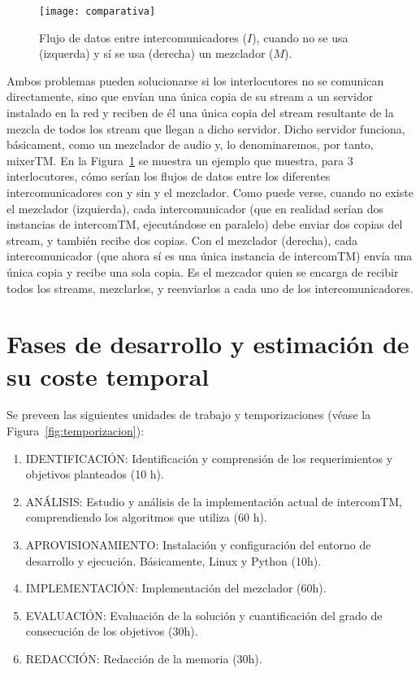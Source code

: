 \documentclass[titlepage, 12pt, a4paper, oneside]{article}
\begin{document}
\begin{figure}
  \begin{center}
    \texttt{[image: comparativa]}
  \end{center}
  \caption{Flujo de datos entre intercomunicadores ($I$), cuando no se
    usa (izquerda) y sí se usa (derecha) un mezclador ($M$).}
  \label{fig:comparativa}
\end{figure}

Ambos problemas pueden solucionarse si los interlocutores no se
comunican directamente, sino que envían una única copia de su stream a
un servidor instalado en la red y reciben de él una única copia del
stream resultante de la mezcla de todos los stream que llegan a dicho
servidor. Dicho servidor funciona, básicament, como un mezclador de
audio y, lo denominaremos, por tanto, mixerTM. En la
Figura~\ref{fig:comparativa} se muestra un ejemplo que muestra, para 3
interlocutores, cómo serían los flujos de datos entre los diferentes
intercomunicadores con y sin y el mezclador. Como puede verse, cuando
no existe el mezclador (izquierda), cada intercomunicador (que en
realidad serían dos instancias de intercomTM, ejecutándose en
paralelo) debe enviar dos copias del stream, y también recibe dos
copias. Con el mezclador (derecha), cada intercomunicador (que ahora
sí es una única instancia de intercomTM) envía una única copia y
recibe una sola copia. Es el mezcador quien se encarga de recibir
todos los streams, mezclarlos, y reenviarlos a cada uno de los
intercomunicadores.

\section{Fases de desarrollo y estimación de su coste temporal}
\label{sec:fases}
Se preveen las siguientes unidades de trabajo y temporizaciones (véase
la Figura~\ref{fig:temporizacion}):
\begin{enumerate}
  \item {IDENTIFICACIÓN}: Identificación y comprensión de los
    requerimientos y objetivos planteados (10 h).
  \item {ANÁLISIS:} Estudio y análisis de la implementación actual de
    intercomTM, comprendiendo los algoritmos que utiliza (60 h).
  \item {APROVISIONAMIENTO}: Instalación y configuración del entorno
    de desarrollo y ejecución. Básicamente, Linux y Python (10h).
  \item {IMPLEMENTACIÓN}: Implementación del mezclador (60h).
  \item {EVALUACIÓN}: Evaluación de la solución y cuantificación del
    grado de consecución de los objetivos (30h).
  \item {REDACCIÓN}: Redacción de la memoria (30h).
\end{enumerate}
\end{document}
